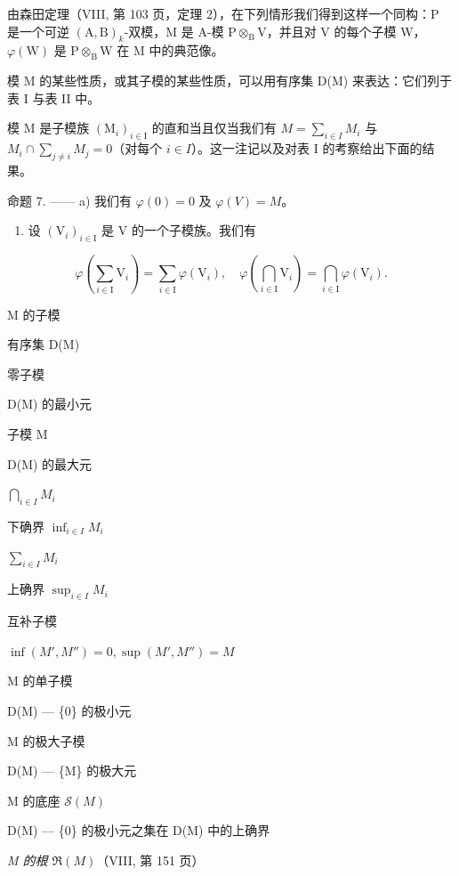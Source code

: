由森田定理（VIII, 第 103 页，定理 2），在下列情形我们得到这样一个同构：P 是一个可逆 \((\mathrm{A},\mathrm{B})_k\)-双模，M 是 A-模 \(\mathrm{P} \otimes_{\mathrm{B}} \mathrm{V}\)，并且对 V 的每个子模 W，\(\varphi(\mathrm{W})\) 是 \(\mathrm{P} \otimes_{\mathrm{B}} \mathrm{W}\) 在 M 中的典范像。

模 M 的某些性质，或其子模的某些性质，可以用有序集 D(M) 来表达：它们列于表 I 与表 II 中。

模 M 是子模族 \((\mathrm{M}_{i})_{i\in\mathrm{I}}\) 的直和当且仅当我们有 \(M=\sum_{i\in I}M_{i}\) 与 \(M_{i}\cap\sum_{j\neq i}M_{j}=0\)（对每个 \(i\in I\)）。这一注记以及对表 I 的考察给出下面的结果。

命题 7. —— a) 我们有 \(\varphi(0)=0\) 及 \(\varphi(V)=M\)。

\begin{enumerate}
\def\labelenumi{\alph{enumi})}
\setcounter{enumi}{1}
\tightlist
\item
  设 \((\mathrm{V}_i)_{i\in \mathrm{I}}\) 是 V 的一个子模族。我们有
\end{enumerate}

\[
\varphi \left(\sum_ {i \in \mathrm{I}} \mathrm{V} _ {i}\right) = \sum_ {i \in \mathrm{I}} \varphi (\mathrm{V} _ {i}), \quad \varphi \left(\bigcap_ {i \in \mathrm{I}} \mathrm{V} _ {i}\right) = \bigcap_ {i \in \mathrm{I}} \varphi (\mathrm{V} _ {i}).
\]

M 的子模

有序集 D(M)

零子模

D(M) 的最小元

子模 M

D(M) 的最大元

\(\bigcap_{i\in I} M_i\)

下确界 \(\inf_{i\in I} M_i\)

\(\sum_{i\in I} M_i\)

上确界 \(\sup_{i\in I} M_i\)

互补子模

\(\inf(M', M'') = 0, \sup(M', M'') = M\)

M 的单子模

D(M) --- \{0\} 的极小元

M 的极大子模

D(M) --- \{M\} 的极大元

M 的底座 \(\mathscr{S}(M)\)

D(M) --- \{0\} 的极小元之集在 D(M) 中的上确界

\emph{M 的根 \(\Re(M)\)}（VIII, 第 151 页）

